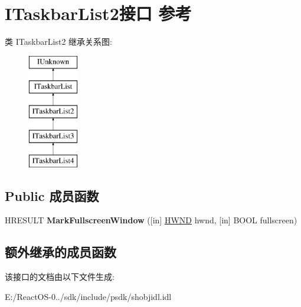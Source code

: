\hypertarget{interface_i_taskbar_list2}{}\section{I\+Taskbar\+List2接口 参考}
\label{interface_i_taskbar_list2}
类 I\+Taskbar\+List2 继承关系图\+:\begin{figure}[H]
\begin{center}
\leavevmode
\includegraphics[height=5.000000cm]{interface_i_taskbar_list2}
\end{center}
\end{figure}
\subsection*{Public 成员函数}
\begin{DoxyCompactItemize}
\item 
\mbox{\label{interface_i_taskbar_list2_a03f3a40ba8c8f47f3c01b17887ccea52}} 
H\+R\+E\+S\+U\+LT {\bfseries Mark\+Fullscreen\+Window} (\mbox{[}in\mbox{]} \hyperlink{interfacevoid}{H\+W\+ND} hwnd, \mbox{[}in\mbox{]} B\+O\+OL fullscreen)
\end{DoxyCompactItemize}
\subsection*{额外继承的成员函数}


该接口的文档由以下文件生成\+:\begin{DoxyCompactItemize}
\item 
E\+:/\+React\+O\+S-\/0../sdk/include/psdk/shobjidl.\+idl\end{DoxyCompactItemize}
